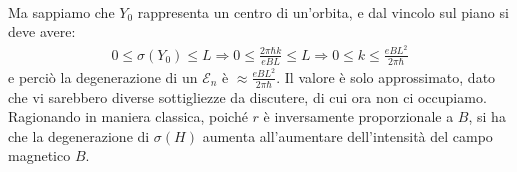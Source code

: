 \documentclass[../../FisicaTeorica.tex]{subfiles}
\begin{document}
\begin{enumerate}
\begin{align*}
\end{align*}
Ma sappiamo che $Y_0$ rappresenta un centro di un'orbita, e dal vincolo sul piano si deve avere:
\begin{align}
0 \leq \sigma(Y_0) \leq L \Rightarrow  0\leq \frac{2\pi\hbar k}{eBL}\leq L \Rightarrow 0 \leq k \leq \frac{eBL^2}{2\pi \hbar}
\label{eqn:degenerazione-landau}
\end{align}
e perciò la degenerazione di un $\mathcal{E}_n$ è $\approx \frac{eBL^2}{2\pi\hbar}$. Il valore è solo approssimato, dato che vi sarebbero diverse sottigliezze da discutere, di cui ora non ci occupiamo. Ragionando in maniera classica, poiché $r$ è inversamente proporzionale a $B$, si ha che la degenerazione di $\sigma(H)$ aumenta all'aumentare dell'intensità del campo magnetico $B$.
\end{enumerate}

\begin{comment}
\subsection{Complemento: le funzioni di Hermite}
I polinomi di Hermite sono definiti come:
\begin{align*}
H_n(x) =\ e^{\frac{x^2}{2}}\left(x-\frac{d}{dx}\right)^n e^{-\frac{x^2}{2}}
\end{align*}
Da cui si definiscono le \textbf{funzioni di Hermite} (normalizzate):
\begin{align*}
h_n(x) &= \left( 2^n n! \sqrt{\pi}\right)^{-\frac{1}{2}} H_n(x) e^{-\frac{x}{2}} =\\
&= (2^n n! \sqrt{\pi})^{-\frac{1}{2}} \left(x-\frac{d}{dx}\right)^n e^{-\frac{x^2}{2}}
\end{align*}
\end{comment}
\end{document}
